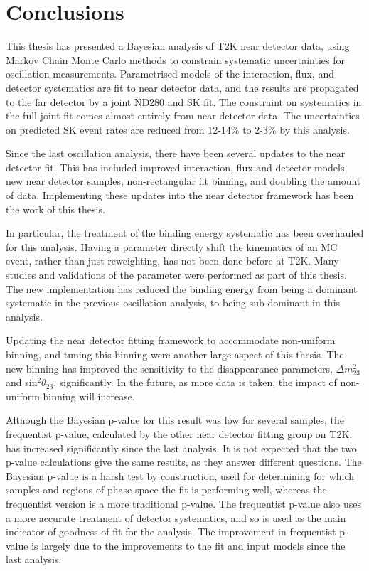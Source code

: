 \chapter{Conclusions}

This thesis has presented a Bayesian analysis of T2K near detector data, using Markov Chain Monte Carlo methods to constrain systematic uncertainties for oscillation measurements. Parametrised models of the interaction, flux, and detector systematics are fit to near detector data, and the results are propagated to the far detector by a joint ND280 and SK fit. The constraint on systematics in the full joint fit comes almost entirely from near detector data. The uncertainties on predicted SK event rates are reduced from 12-14$\%$ to 2-3$\%$ by this analysis. 

Since the last oscillation analysis, there have been several updates to the near detector fit. This has included improved interaction, flux and detector models, new near detector samples, non-rectangular fit binning, and doubling the amount of data. Implementing these updates into the near detector framework has been the work of this thesis.

In particular, the treatment of the binding energy systematic has been overhauled for this analysis. Having a parameter directly shift the kinematics of an MC event, rather than just reweighting, has not been done before at T2K. Many studies and validations of the parameter were performed as part of this thesis. The new implementation has reduced the binding energy from being a dominant systematic in the previous oscillation analysis, to being sub-dominant in this analysis.

Updating the near detector fitting framework to accommodate non-uniform binning, and tuning this binning were another large aspect of this thesis. The new binning has improved the sensitivity to the disappearance parameters, $\Delta m^{2}_{23}$ and sin$^2 \theta_{23}$, significantly. In the future, as more data is taken, the impact of non-uniform binning will increase.

Although the Bayesian p-value for this result was low for several samples, the frequentist p-value, calculated by the other near detector fitting group on T2K, has increased significantly since the last analysis. It is not expected that the two p-value calculations give the same results, as they answer different questions. The Bayesian p-value is a harsh test by construction, used for determining for which samples and regions of phase space the fit is performing well, whereas the frequentist version is a more traditional p-value. The frequentist p-value also uses a more accurate treatment of detector systematics, and so is used as the main indicator of goodness of fit for the analysis. The improvement in frequentist p-value is largely due to the improvements to the fit and input models since the last analysis.

